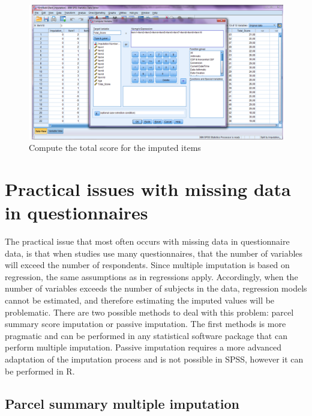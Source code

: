 \documentclass[
]{book}
\begin{document}
\begin{figure}

{\centering \includegraphics[width=0.9\linewidth]{images/fig8.6} 

}

\caption{Compute the total score for the imputed items}\label{fig:fig8-6}
\end{figure}

\hypertarget{practical-issues-with-missing-data-in-questionnaires}{%
\section{Practical issues with missing data in questionnaires}\label{practical-issues-with-missing-data-in-questionnaires}}

The practical issue that most often occurs with missing data in questionnaire data, is that when studies use many questionnaires, that the number of variables will exceed the number of respondents. Since multiple imputation is based on regression, the same assumptions as in regressions apply. Accordingly, when the number of variables exceeds the number of subjects in the data, regression models cannot be estimated, and therefore estimating the imputed values will be problematic.
There are two possible methods to deal with this problem: parcel summary score imputation or passive imputation. The first methods is more pragmatic and can be performed in any statistical software package that can perform multiple imputation. Passive imputation requires a more advanced adaptation of the imputation process and is not possible in SPSS, however it can be performed in R.

\hypertarget{parcel-summary-multiple-imputation}{%
\subsection{Parcel summary multiple imputation}\label{parcel-summary-multiple-imputation}}
\end{document}

